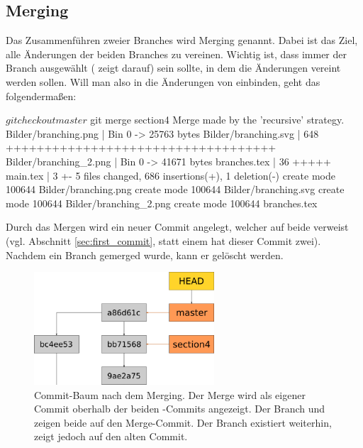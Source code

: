 \subsection{Merging}
Das Zusammenführen zweier Branches wird Merging genannt. Dabei ist das Ziel, alle Änderungen der beiden Branches zu vereinen. Wichtig ist, dass immer der Branch ausgewählt ( zeigt darauf) sein sollte, in dem die Änderungen vereint werden sollen. Will man also in  die Änderungen von  einbinden, geht das folgendermaßen:
\begin{mplisting}
$ git checkout master
$ git merge section4
Merge made by the 'recursive' strategy.
Bilder/branching.png   | Bin 0 -> 25763 bytes
Bilder/branching.svg   | 648 +++++++++++++++++++++++++++++++++++
Bilder/branching_2.png | Bin 0 -> 41671 bytes
branches.tex           |  36 +++++
main.tex               |   3 +-
5 files changed, 686 insertions(+), 1 deletion(-)
create mode 100644 Bilder/branching.png
create mode 100644 Bilder/branching.svg
create mode 100644 Bilder/branching_2.png
create mode 100644 branches.tex
\end{mplisting}
Durch das Mergen wird ein neuer Commit angelegt, welcher auf beide   verweist (vgl. Abschnitt \ref{sec:first_commit}, statt einem  hat dieser Commit zwei). Nachdem ein Branch gemerged wurde, kann er gelöscht werden.
\begin{figure}[!ht]
	\centering
	\includegraphics[width=0.6\textwidth]{Bilder/branching_3.png}
	\caption{Commit-Baum nach dem Merging. Der Merge wird als eigener Commit oberhalb der beiden -Commits angezeigt. Der  Branch und  zeigen beide auf den Merge-Commit. Der  Branch existiert weiterhin, zeigt jedoch auf den alten Commit.}
	\label{fig:merge}
\end{figure}

